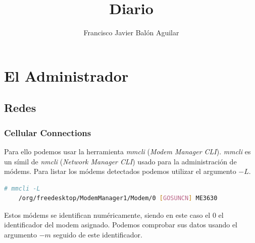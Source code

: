 \documentclass[a4paper, 11pt, titlepage]{book}
\title{Diario}
\author{Francisco Javier Balón Aguilar}
\begin{document}
\maketitle
\renewcommand{\contentsname}{Índice}
\tableofcontents
\newpage

\chapter{El Administrador}

    \section{Redes}

        \subsection{Cellular Connections}

            Para ello podemos usar la herramienta \textit{mmcli} (\textit{Modem Manager CLI}). 
            \textit{mmcli} es un símil de \textit{nmcli} (\textit{Network Manager CLI}) usado 
            para la administración de módems. Para listar los módems detectados podemos utilizar 
            el argumento $-L$.

            \begin{lstlisting}[language=bash,basicstyle=\footnotesize]
    # mmcli -L
    /org/freedesktop/ModemManager1/Modem/0 [GOSUNCN] ME3630\end{lstlisting}

            Estos módems se identifican numéricamente, siendo en este caso el $0$ el identificador 
            del modem asignado. Podemos comprobar sus datos usando el argumento $-m$ seguido de este
            identificador.
\end{document}
